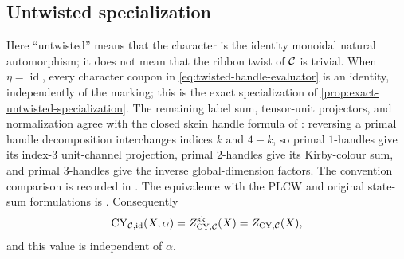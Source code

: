 \subsection{Untwisted specialization}
\label{subsec:untwisted-specialization}

\begin{remark}
\label{rem:untwisted-comparison}
Here ``untwisted'' means that the character is the identity monoidal natural
automorphism; it does not mean that the ribbon twist of \(\mathcal{C}\) is trivial.
When \(\eta=\operatorname{id}\), every character coupon in
\eqref{eq:twisted-handle-evaluator} is an identity, independently of the
marking; this is the exact specialization of
\cref{prop:exact-untwisted-specialization}.  The remaining label sum,
tensor-unit projectors, and normalization
agree with the closed skein handle formula of
\cite[Definition~5.11]{Tham2021}: reversing a primal handle decomposition
interchanges indices \(k\) and \(4-k\), so primal \(1\)-handles give its
index-\(3\) unit-channel projection, primal \(2\)-handles give its Kirby-colour
sum, and primal \(3\)-handles give the inverse global-dimension factors.
The convention comparison is recorded in
\cite[Example~9.1 and Remark~9.2]{Tham2021}.  The equivalence with the PLCW
and original state-sum formulations is
\cite[Theorems~5.25, 5.26, and~3.61]{Tham2021}.  Consequently
\[
  \operatorname{CY}_{\mathcal{C},\operatorname{id}}(X,\alpha)
  =Z^{\mathrm{sk}}_{\mathrm{CY},\mathcal{C}}(X)
  =Z_{\mathrm{CY},\mathcal{C}}(X),
\]
and this value is independent of \(\alpha\).
\end{remark}
